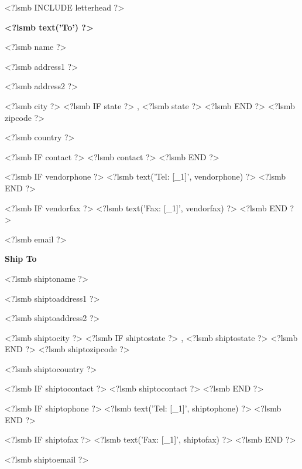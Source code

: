 \documentclass{scrartcl}
\begin{document}
\pagestyle{myheadings}
\thispagestyle{empty}

\fontsize{10pt}{12pt}\selectfont

<?lsmb INCLUDE letterhead ?>




\vspace*{0.5cm}

\parbox[t]{.5\textwidth}{
\textbf{<?lsmb text('To') ?>}
\vspace{0.3cm}

<?lsmb name ?>

<?lsmb address1 ?>

<?lsmb address2 ?>

<?lsmb city ?>
<?lsmb IF state ?>
\hspace{-0.1cm}, <?lsmb state ?>
<?lsmb END ?>
<?lsmb zipcode ?>

<?lsmb country ?>

\vspace{0.3cm}

<?lsmb IF contact ?>
<?lsmb contact ?>
\vspace{0.2cm}
<?lsmb END ?>

<?lsmb IF vendorphone ?>
<?lsmb text('Tel: [_1]', vendorphone) ?>
<?lsmb END ?>

<?lsmb IF vendorfax ?>
<?lsmb text('Fax: [_1]', vendorfax) ?>
<?lsmb END ?>

<?lsmb email ?>
}
\parbox[t]{.5\textwidth}{
\textbf{Ship To}
\vspace{0.3cm}

<?lsmb shiptoname ?>

<?lsmb shiptoaddress1 ?>

<?lsmb shiptoaddress2 ?>

<?lsmb shiptocity ?>
<?lsmb IF shiptostate ?>
\hspace{-0.1cm}, <?lsmb shiptostate ?>
<?lsmb END ?>
<?lsmb shiptozipcode ?>

<?lsmb shiptocountry ?>

\vspace{0.3cm}

<?lsmb IF shiptocontact ?>
<?lsmb shiptocontact ?>
\vspace{0.2cm}
<?lsmb END ?>

<?lsmb IF shiptophone ?>
<?lsmb text('Tel: [_1]', shiptophone) ?>
<?lsmb END ?>

<?lsmb IF shiptofax ?>
<?lsmb text('Fax: [_1]', shiptofax) ?>
<?lsmb END ?>

<?lsmb shiptoemail ?>
}
\hfill
\end{document}
